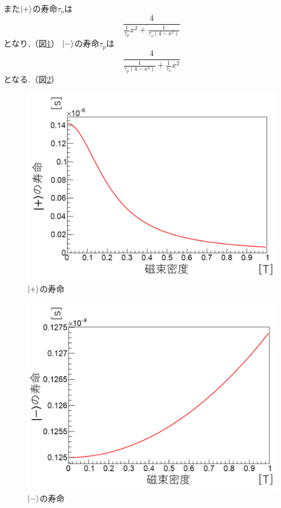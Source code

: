 また$\ket{+}$の寿命$\tau_{o}$は
\begin{equation}
	\nonumber
\frac{4}{\frac{1}{\tau_{p}}x^{2}+\frac{1}{\tau_{o}(4-x^{2})}}
\end{equation}
となり,（図\ref{fig:pluslife}）
$\ket{-}$の寿命$\tau_{p}$は
\begin{equation}
	\nonumber
\frac{4}{\frac{1}{\tau_{p}(4-x^{2})}+\frac{1}{\tau_{o}}x^{2}}
\end{equation}
となる.（図\ref{fig:minuslife}）

\begin{figure}[H]
\centering
\includegraphics[keepaspectratio,scale=0.5]{fig/ybm/pluslife.pdf}
\caption{$\ket{+}$の寿命}
\label{fig:pluslife}
\end{figure}

\begin{figure}[H]
\centering
\includegraphics[keepaspectratio,scale=0.5]{fig/ybm/minuslife.pdf}
\caption{$\ket{-}$の寿命}
\label{fig:minuslife}
\end{figure}


